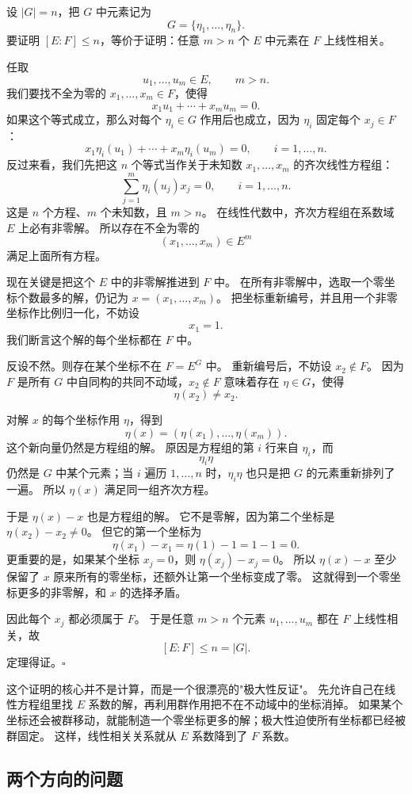 设 $|G|=n$，把 $G$ 中元素记为
\[
G=\{\eta_1,\ldots,\eta_n\}.
\]
要证明 $[E:F]\leq n$，等价于证明：任意 $m>n$ 个 $E$ 中元素在 $F$ 上线性相关。

任取
\[
u_1,\ldots,u_m\in E,\qquad m>n.
\]
我们要找不全为零的 $x_1,\ldots,x_m\in F$，使得
\[
x_1u_1+\cdots+x_mu_m=0.
\]
如果这个等式成立，那么对每个 $\eta_i\in G$ 作用后也成立，因为 $\eta_i$ 固定每个 $x_j\in F$：
\[
x_1\eta_i(u_1)+\cdots+x_m\eta_i(u_m)=0,\qquad i=1,\ldots,n.
\]
反过来看，我们先把这 $n$ 个等式当作关于未知数 $x_1,\ldots,x_m$ 的齐次线性方程组：
\[
\sum_{j=1}^m \eta_i(u_j)x_j=0,\qquad i=1,\ldots,n.
\]
这是 $n$ 个方程、$m$ 个未知数，且 $m>n$。
在线性代数中，齐次方程组在系数域 $E$ 上必有非零解。
所以存在不全为零的
\[
(x_1,\ldots,x_m)\in E^m
\]
满足上面所有方程。

现在关键是把这个 $E$ 中的非零解推进到 $F$ 中。
在所有非零解中，选取一个零坐标个数最多的解，仍记为 $x=(x_1,\ldots,x_m)$。
把坐标重新编号，并且用一个非零坐标作比例归一化，不妨设
\[
x_1=1.
\]
我们断言这个解的每个坐标都在 $F$ 中。

反设不然。则存在某个坐标不在 $F=E^G$ 中。
重新编号后，不妨设 $x_2\notin F$。
因为 $F$ 是所有 $G$ 中自同构的共同不动域，$x_2\notin F$ 意味着存在 $\eta\in G$，使得
\[
\eta(x_2)\neq x_2.
\]

对解 $x$ 的每个坐标作用 $\eta$，得到
\[
\eta(x)=(\eta(x_1),\ldots,\eta(x_m)).
\]
这个新向量仍然是方程组的解。
原因是方程组的第 $i$ 行来自 $\eta_i$，而
\[
\eta_i\eta
\]
仍然是 $G$ 中某个元素；当 $i$ 遍历 $1,\ldots,n$ 时，$\eta_i\eta$ 也只是把 $G$ 的元素重新排列了一遍。
所以 $\eta(x)$ 满足同一组齐次方程。

于是 $\eta(x)-x$ 也是方程组的解。
它不是零解，因为第二个坐标是 $\eta(x_2)-x_2\neq0$。
但它的第一个坐标为
\[
\eta(x_1)-x_1=\eta(1)-1=1-1=0.
\]
更重要的是，如果某个坐标 $x_j=0$，则 $\eta(x_j)-x_j=0$。
所以 $\eta(x)-x$ 至少保留了 $x$ 原来所有的零坐标，还额外让第一个坐标变成了零。
这就得到一个零坐标更多的非零解，和 $x$ 的选择矛盾。

因此每个 $x_j$ 都必须属于 $F$。
于是任意 $m>n$ 个元素 $u_1,\ldots,u_m$ 都在 $F$ 上线性相关，故
\[
[E:F]\leq n=|G|.
\]
定理得证。$\square$

这个证明的核心并不是计算，而是一个很漂亮的"极大性反证"。
先允许自己在线性方程组里找 $E$ 系数的解，再利用群作用把不在不动域中的坐标消掉。
如果某个坐标还会被群移动，就能制造一个零坐标更多的解；极大性迫使所有坐标都已经被群固定。
这样，线性相关关系就从 $E$ 系数降到了 $F$ 系数。

\subsection{两个方向的问题}

